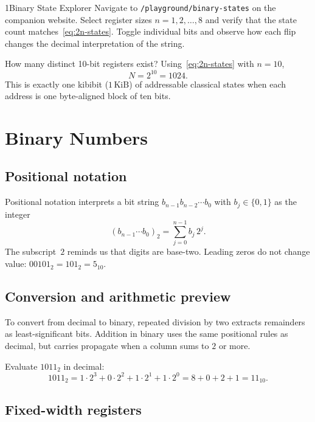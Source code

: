 \begin{labbox}{1}{Binary State Explorer}
Navigate to \texttt{/playground/binary-states} on the companion website. Select register sizes $n=1,2,\ldots,8$ and verify that the state count matches~\eqref{eq:2n-states}. Toggle individual bits and observe how each flip changes the decimal interpretation of the string.
\end{labbox}

\begin{example}
How many distinct 10-bit registers exist? Using~\eqref{eq:2n-states} with $n=10$,
\[
N = 2^{10} = 1024.
\]
This is exactly one kibibit ($1\,\mathrm{KiB}$) of addressable classical states when each address is one byte-aligned block of ten bits.
\end{example}

\section{Binary Numbers}
\label{sec:binary}

\subsection{Positional notation}

Positional notation interprets a bit string $b_{n-1}b_{n-2}\cdots b_0$ with $b_j\in\{0,1\}$ as the integer
\begin{equation}
(b_{n-1}\cdots b_0)_2 = \sum_{j=0}^{n-1} b_j\, 2^j.
\label{eq:binary-positional}
\end{equation}
The subscript~$2$ reminds us that digits are base-two. Leading zeros do not change value: $00101_2 = 101_2 = 5_{10}$.

\subsection{Conversion and arithmetic preview}

To convert from decimal to binary, repeated division by two extracts remainders as least-significant bits. Addition in binary uses the same positional rules as decimal, but carries propagate when a column sums to $2$ or more.

\begin{example}
Evaluate $1011_2$ in decimal:
\[
1011_2 = 1\cdot 2^3 + 0\cdot 2^2 + 1\cdot 2^1 + 1\cdot 2^0 = 8 + 0 + 2 + 1 = 11_{10}.
\]
\end{example}

\subsection{Fixed-width registers}


